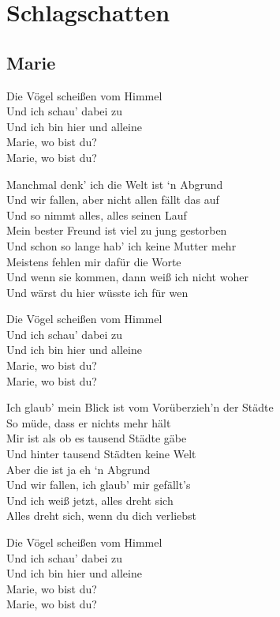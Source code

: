 \documentclass[]{book}
\begin{document}
\hypertarget{schlagschatten}{%
\chapter{Schlagschatten}\label{schlagschatten}}

\hypertarget{marie}{%
\section{Marie}\label{marie}}

Die Vögel scheißen vom Himmel\\
Und ich schau' dabei zu\\
Und ich bin hier und alleine\\
Marie, wo bist du?\\
Marie, wo bist du?

Manchmal denk' ich die Welt ist `n Abgrund\\
Und wir fallen, aber nicht allen fällt das auf\\
Und so nimmt alles, alles seinen Lauf\\
Mein bester Freund ist viel zu jung gestorben\\
Und schon so lange hab' ich keine Mutter mehr\\
Meistens fehlen mir dafür die Worte\\
Und wenn sie kommen, dann weiß ich nicht woher\\
Und wärst du hier wüsste ich für wen

Die Vögel scheißen vom Himmel\\
Und ich schau' dabei zu\\
Und ich bin hier und alleine\\
Marie, wo bist du?\\
Marie, wo bist du?

Ich glaub' mein Blick ist vom Vorüberzieh'n der Städte\\
So müde, dass er nichts mehr hält\\
Mir ist als ob es tausend Städte gäbe\\
Und hinter tausend Städten keine Welt\\
Aber die ist ja eh `n Abgrund\\
Und wir fallen, ich glaub' mir gefällt's\\
Und ich weiß jetzt, alles dreht sich\\
Alles dreht sich, wenn du dich verliebst

Die Vögel scheißen vom Himmel\\
Und ich schau' dabei zu\\
Und ich bin hier und alleine\\
Marie, wo bist du?\\
Marie, wo bist du?
\end{document}
